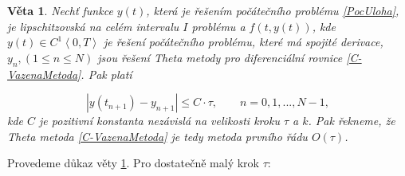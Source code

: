\documentclass[a4paper,12pt,twoside]{article}
\newtheorem{veta}{Věta}[section]
\theoremstyle{definition}
\theoremstyle{remark}
\numberwithin{equation}{section}
\numberwithin{table}{section}
\numberwithin{figure}{section}
\begin{document}
\begin{veta} \label{RadEulerovyMetody}%
	Nechť funkce $y\left(t\right)$, která je řešením počátečního problému \eqref{PocUloha}, je lipschitzovská na celém intervalu $I$ problému a $f \left(t,y \left(t\right)\right)$, kde $y\left(t\right) \in C^{1}\left\langle 0, T\right\rangle$ je řešení počátečního problému, které má spojité derivace,
	$y_{n}, \left(1 \leq n \leq N\right)$ jsou řešení Theta metody pro diferenciální rovnice \eqref{C-VazenaMetoda}. Pak platí
	
	\begin{equation}
		|y\left(t_{n+1}\right) - y_{n+1}| \leq C\cdot \tau, \qquad n = 0,1, ..., N-1,
	\end{equation} 
	kde $C$ je pozitivní konstanta nezávislá na velikosti kroku $\tau$  a $k$. Pak řekneme, že Theta metoda \eqref{C-VazenaMetoda} je tedy metoda prvního řádu $O\left(\tau\right)$. \cite{Cangpin}
\end{veta}
Provedeme důkaz věty \ref{RadEulerovyMetody}. Pro dostatečně malý krok $\tau$:
\end{document}

